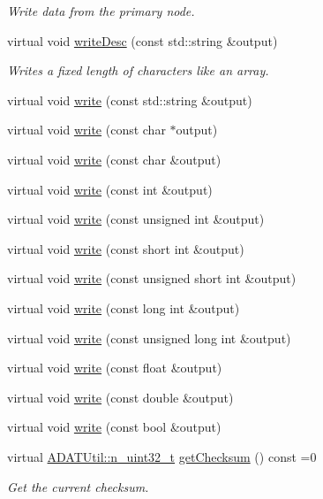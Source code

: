 \begin{DoxyCompactItemize}
\begin{DoxyCompactList}\small\item\em Write data from the primary node. \end{DoxyCompactList}\item 
virtual void \mbox{\hyperlink{classADATIO_1_1BinaryWriter_a616c82aa0768386f730781d4e8552328}{write\+Desc}} (const std\+::string \&output)
\begin{DoxyCompactList}\small\item\em Writes a fixed length of characters like an array. \end{DoxyCompactList}\item 
virtual void \mbox{\hyperlink{classADATIO_1_1BinaryWriter_ac7731874e4949f80f0edbad2474c4b64}{write}} (const std\+::string \&output)
\item 
virtual void \mbox{\hyperlink{classADATIO_1_1BinaryWriter_add59d41e33f9b8c1ef59247c8bf59084}{write}} (const char $\ast$output)
\item 
virtual void \mbox{\hyperlink{classADATIO_1_1BinaryWriter_a910cfae9646644ba79a79b5686099fa9}{write}} (const char \&output)
\item 
virtual void \mbox{\hyperlink{classADATIO_1_1BinaryWriter_a9fb82fed7fa1a453686b39469528735b}{write}} (const int \&output)
\item 
virtual void \mbox{\hyperlink{classADATIO_1_1BinaryWriter_a8598a3f7e532ca1b4c12080810e4af23}{write}} (const unsigned int \&output)
\item 
virtual void \mbox{\hyperlink{classADATIO_1_1BinaryWriter_ad03df4b7455f1de8a8a9398f812c221d}{write}} (const short int \&output)
\item 
virtual void \mbox{\hyperlink{classADATIO_1_1BinaryWriter_ac86f9ad5ac94ba5d2b9f082910016621}{write}} (const unsigned short int \&output)
\item 
virtual void \mbox{\hyperlink{classADATIO_1_1BinaryWriter_a4cbdd50c040308cc568e3686cc5e3498}{write}} (const long int \&output)
\item 
virtual void \mbox{\hyperlink{classADATIO_1_1BinaryWriter_a56802b37bf83a416fc8b12fab0372306}{write}} (const unsigned long int \&output)
\item 
virtual void \mbox{\hyperlink{classADATIO_1_1BinaryWriter_afa3e113cbf2644b6a568fd13a8a14a98}{write}} (const float \&output)
\item 
virtual void \mbox{\hyperlink{classADATIO_1_1BinaryWriter_a35edd828ed0235e1547a76088c133f46}{write}} (const double \&output)
\item 
virtual void \mbox{\hyperlink{classADATIO_1_1BinaryWriter_ac74f1fed73f135b69624436713ba8fe9}{write}} (const bool \&output)
\item 
virtual \mbox{\hyperlink{namespaceADATUtil_ad945a8afa4db2d1f89b731964adae97e}{A\+D\+A\+T\+Util\+::n\+\_\+uint32\+\_\+t}} \mbox{\hyperlink{classADATIO_1_1BinaryWriter_a8bebb70a7248b14c8a4dcf7aa49c1503}{get\+Checksum}} () const =0
\begin{DoxyCompactList}\small\item\em Get the current checksum. \end{DoxyCompactList}\end{DoxyCompactItemize}

